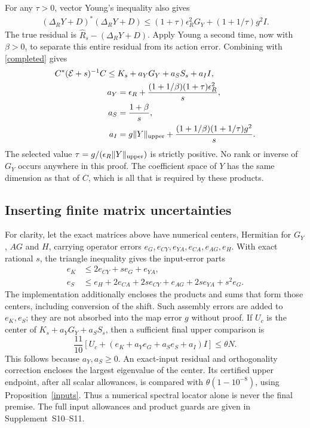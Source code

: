 \documentclass[12pt]{article}
\theoremstyle{remark}\newtheorem{remark}[theorem]{Remark}
\begin{document}
For any $\tau>0$, vector Young's inequality also gives
\begin{align*}
 (\Delta_RY+D)^*(\Delta_RY+D)
 \le (1+\tau)\epsilon_R^2G_Y+(1+1/\tau)g^2I.
\end{align*}
The true residual is $\widehat R_s-(\Delta_RY+D)$. Apply Young a
second time, now with $\beta>0$, to separate this entire residual
from its action error. Combining with \eqref{completed} gives
\begin{align}\label{re5main}
 C^*(\mathcal E+s)^{-1}C\le{}&K_s+a_YG_Y+a_SS_s+a_II,\\
 a_Y&=\epsilon_R+
          \frac{(1+1/\beta)(1+\tau)\epsilon_R^2}{s},\nonumber\\
 a_S&=\frac{1+\beta}{s},\nonumber\\
 a_I&=g\|Y\|_{\rm upper}
       +\frac{(1+1/\beta)(1+1/\tau)g^2}{s}.\nonumber
\end{align}
The selected value $\tau=g/(\epsilon_R\|Y\|_{\rm upper})$ is
strictly positive. No rank or inverse of $G_Y$ occurs anywhere in
this proof. The coefficient space of $Y$ has the same dimension as
that of $C$, which is all that is required by these products.

\subsection{Inserting finite matrix uncertainties}
For clarity, let the exact matrices above have numerical centers,
Hermitian for $G_Y$, $AG$ and $H$, carrying operator errors
$e_G,e_{CY},e_{YA},e_{CA},e_{AG},e_H$.
With exact rational $s$, the triangle inequality gives the input-error
parts
\begin{align*}
 e_K&\le2e_{CY}+se_G+e_{YA},\\
 e_S&\le e_H+2e_{CA}+2se_{CY}+e_{AG}
                  +2se_{YA}+s^2e_G.
\end{align*}
The implementation additionally encloses the products and sums that
form those centers, including conversion of the shift. Such assembly
errors are added to $e_K,e_S$; they are not absorbed into the map
error $g$ without proof. If $U_c$ is the center of
$K_s+a_YG_Y+a_SS_s$, then a sufficient final upper comparison is
\[
 \frac{11}{10}\left[U_c+
       (e_K+a_Ye_G+a_Se_S+a_I)I\right]\le\theta N.
\]
This follows because $a_Y,a_S\ge0$. An exact-input residual and
orthogonality correction encloses the largest eigenvalue of the
center. Its certified upper endpoint, after all scalar allowances,
is compared with $\theta(1-10^{-8})$, using Proposition~\ref{inputs}.
Thus a numerical spectral locator alone is never the final premise.
The full input allowances and product guards are given in
Supplement~S10--S11.
\end{document}
